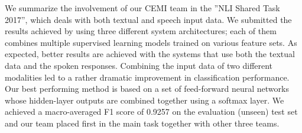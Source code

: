 We summarize the involvement of our CEMI team in the ''NLI Shared Task 2017'', which deals with both textual and speech input data. We submitted the results achieved by using three different system architectures; each of them combines multiple supervised learning models trained on various feature sets. As expected, better results are achieved with the systems that use both the textual data and the spoken responses. Combining the input data of two different modalities led to a rather dramatic improvement in classification performance. Our best performing method is based on a set of feed-forward neural networks whose hidden-layer outputs are combined together using a softmax layer. We achieved a macro-averaged F1 score of 0.9257 on the evaluation (unseen) test set and our team placed first in the main task together with other three teams.
